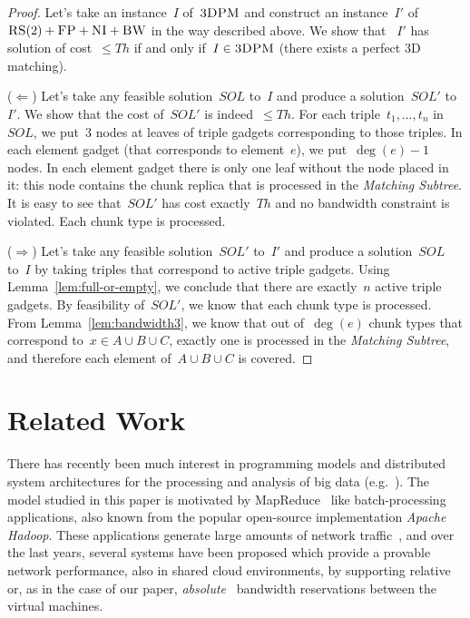 \documentclass[preprint,12pt]{elsarticle}
\newcommand{\CC}{\textsc{NI}}
\newcommand{\FP}{\textsc{FP}}
\newcommand{\RS}{\textsc{RS}}
\newcommand{\BW}{\textsc{BW}}
\newcommand{\TDPM}{\textsc{3DPM}}
\newcommand{\MatchSubtree}{{\emph{Matching Subtree}}}
\newcommand{\Thr}{\ensuremath{Th}}
\newcommand{\Sol}{\ensuremath{SOL}}
\begin{document}
\begin{proof}
  Let's take an instance~$I$ of~$\TDPM$ and construct an instance~$I'$
  of~$\RS(2)+\FP+\CC+\BW$ in the way described above.  We show that
 ~$I'$ has solution of cost~$\leq \Thr$ if and only if~$I \in \TDPM$
  (there exists a perfect 3D matching).

  ($\Leftarrow$) Let's take any feasible solution~$\Sol$ to~$I$ and
  produce a solution~$\Sol'$ to~$I'$. We show that the cost of~$\Sol'$ is
  indeed~$\leq \Thr$.
  For each triple~$t_1,\ldots, t_n$ in~$\Sol$, we put~$3$ nodes at
  leaves of triple gadgets corresponding to those triples.  In each
  element gadget (that corresponds to element~$e$), we put~$\deg(e)-1$
  nodes. In each element gadget there is only one leaf without the
  node placed in it: this node contains the chunk replica that is
  processed in the {\MatchSubtree}.
  It is easy to see that~$\Sol'$ has cost exactly~$\Thr$ and no
  bandwidth constraint is violated. Each chunk type is processed.

  ($\Rightarrow$) Let's take any feasible solution~$\Sol'$ to~$I'$ and
  produce a solution~$\Sol$ to~$I$ by taking triples that correspond
  to active triple gadgets. Using Lemma~\ref{lem:full-or-empty}, we
  conclude that there are exactly~$n$ active triple gadgets. By
  feasibility of~$\Sol'$, we know that each chunk type is
  processed. From Lemma~\ref{lem:bandwidth3}, we know that out
  of~$\deg(e)$ chunk types that correspond to~$x\in A\cup B\cup C$,
  exactly one is processed in the {\MatchSubtree}, and therefore each
  element of~$A\cup B\cup C$ is covered.
\end{proof}

\section{Related Work}\label{sec:relwork}

There has recently been much interest in programming models and distributed
system architectures for the processing and analysis of big data (e.g.~\cite{nodb,mapreduce,shark}). The model studied in
this paper is motivated by MapReduce~\cite{mapreduce} like batch-processing applications, also known
from the popular open-source implementation \emph{Apache Hadoop}.
These applications
generate large amounts of network traffic~\cite{orchestra,talk-about,amazonbw},
and over the last years, several systems have been proposed which provide
a provable network performance, also in shared cloud environments, by supporting
relative~\cite{faircloud,elasticswitch,seawall}
or, as in the case of our paper, \emph{absolute}~\cite{oktopus,secondnet,drl,gatekeeper,proteus} bandwidth reservations
between the virtual machines.
\end{document}
